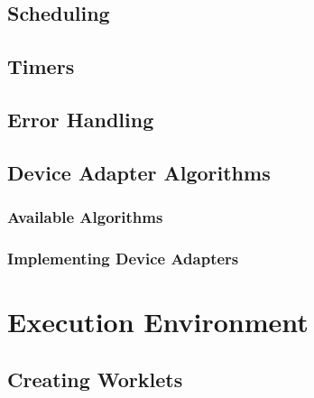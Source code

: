 
\subsection{Scheduling}
\label{sec:Scheduling}


\subsection{Timers}
\label{sec:Timers}


\subsection{Error Handling}
\label{sec:ErrorHandling}


\subsection{Device Adapter Algorithms}
\label{sec:DeviceAdapterAlgorithms}

\subsubsection{Available Algorithms}


\subsubsection{Implementing Device Adapters}





\section{Execution Environment}
\label{sec:ExecutionEnvironment}


\subsection{Creating Worklets}
\label{sec:CreatingWorklets}

